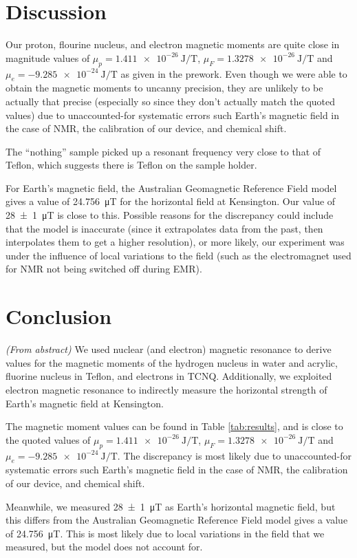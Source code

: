 \documentclass[a4paper]{scrartcl}
\begin{document}
\section{Discussion}
Our proton, flourine nucleus, and electron magnetic moments are quite close in magnitude values of \(\mu_p = \SI{1.411e-26}{\joule\per\tesla}\), \(\mu_F = \SI{1.3278e-26}{\joule\per\tesla}\) and \(\mu_e = \SI{-9.285e-24}{\joule\per\tesla}\) as given in the prework. Even though we were able to obtain the magnetic moments to uncanny precision, they are unlikely to be actually that precise (especially so since they don't actually match the quoted values) due to unaccounted-for systematic errors such Earth's magnetic field in the case of NMR, the calibration of our device, and chemical shift.

The ``nothing'' sample picked up a resonant frequency very close to that of Teflon, which suggests there is Teflon on the sample holder.

For Earth's magnetic field, the Australian Geomagnetic Reference Field model gives a value of \SI{24.756}{\micro\tesla} for the horizontal field at Kensington. Our value of \SI{28 \pm 1}{\micro\tesla} is close to this. Possible reasons for the discrepancy could include that the model is inaccurate (since it extrapolates data from the past, then interpolates them to get a higher resolution), or more likely, our experiment was under the influence of local variations to the field (such as the electromagnet used for NMR not being switched off during EMR).

\section{Conclusion}
\emph{(From abstract)} We used nuclear (and electron) magnetic resonance to derive values for the magnetic moments of the hydrogen nucleus in water and acrylic, fluorine nucleus in Teflon, and electrons in TCNQ. Additionally, we exploited electron magnetic resonance to indirectly measure the horizontal strength of Earth's magnetic field at Kensington.

The magnetic moment values can be found in Table \ref{tab:results}, and is close to the quoted values of \(\mu_p = \SI{1.411e-26}{\joule\per\tesla}\), \(\mu_F = \SI{1.3278e-26}{\joule\per\tesla}\) and \(\mu_e = \SI{-9.285e-24}{\joule\per\tesla}\). The discrepancy is most likely due to unaccounted-for systematic errors such Earth's magnetic field in the case of NMR, the calibration of our device, and chemical shift.

Meanwhile, we measured  \SI{28 \pm 1}{\micro\tesla} as Earth's horizontal magnetic field, but this differs from the Australian Geomagnetic Reference Field model gives a value of \SI{24.756}{\micro\tesla}. This is most likely due to local variations in the field that we measured, but the model does not account for.
\end{document}
